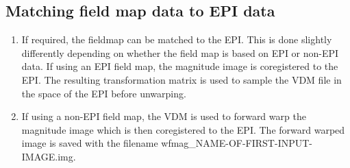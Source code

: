 \subsection{Matching field map data to EPI data}
\begin{enumerate}
\item{If required, the fieldmap can be matched to the EPI. This is done slightly differently depending on whether the field map is based on EPI or non-EPI data. If using an EPI field map, the magnitude image is coregistered to the EPI. The resulting transformation matrix is used to sample the VDM file in the space of the EPI before unwarping. 
}
\item{If using a non-EPI field map, the VDM is used to forward warp the magnitude image which is then coregistered to the EPI. The forward warped image is saved with the filename wfmag\_NAME-OF-FIRST-INPUT-IMAGE.img. 
}
\end{enumerate}


